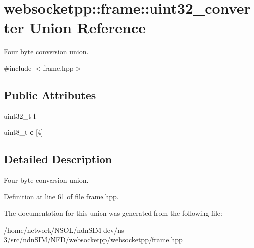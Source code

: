 \hypertarget{unionwebsocketpp_1_1frame_1_1uint32__converter}{}\section{websocketpp\+:\+:frame\+:\+:uint32\+\_\+converter Union Reference}
\label{unionwebsocketpp_1_1frame_1_1uint32__converter}


Four byte conversion union.  




{\ttfamily \#include $<$frame.\+hpp$>$}

\subsection*{Public Attributes}
\begin{DoxyCompactItemize}
\item 
uint32\+\_\+t {\bfseries i}\hypertarget{unionwebsocketpp_1_1frame_1_1uint32__converter_a2bceb785be148d7c9b9ce11240595440}{}\label{unionwebsocketpp_1_1frame_1_1uint32__converter_a2bceb785be148d7c9b9ce11240595440}

\item 
uint8\+\_\+t {\bfseries c} \mbox{[}4\mbox{]}\hypertarget{unionwebsocketpp_1_1frame_1_1uint32__converter_ad7e9db5dd4002d78e9aaf624d39fd69c}{}\label{unionwebsocketpp_1_1frame_1_1uint32__converter_ad7e9db5dd4002d78e9aaf624d39fd69c}

\end{DoxyCompactItemize}


\subsection{Detailed Description}
Four byte conversion union. 

Definition at line 61 of file frame.\+hpp.



The documentation for this union was generated from the following file\+:\begin{DoxyCompactItemize}
\item 
/home/network/\+N\+S\+O\+L/ndn\+S\+I\+M-\/dev/ns-\/3/src/ndn\+S\+I\+M/\+N\+F\+D/websocketpp/websocketpp/frame.\+hpp\end{DoxyCompactItemize}
